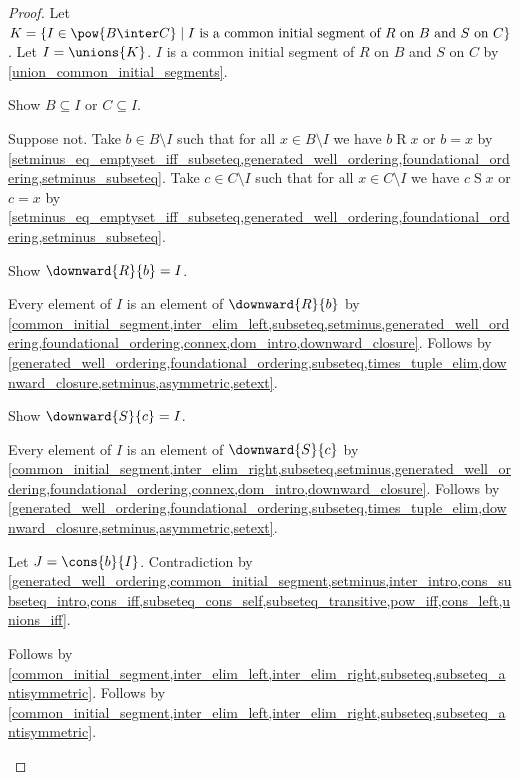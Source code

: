 \begin{proof}
    Let $K = \{I\in\pow{B\inter C}\mid \text{$I$ is a common initial segment of $R$ on $B$ and $S$ on $C$}\}$.
    Let $I = \unions{K}$.
    $I$ is a common initial segment of $R$ on $B$ and $S$ on $C$
        by \cref{union_common_initial_segments}.

    Show $B\subseteq I$ or $C\subseteq I$.
    \begin{subproof}
        Suppose not.
        Take $b\in B\setminus I$ such that for all $x\in B\setminus I$
            we have $b\mathrel{R}x$ or $b=x$ by \cref{setminus_eq_emptyset_iff_subseteq,generated_well_ordering,foundational_ordering,setminus_subseteq}.
        Take $c\in C\setminus I$ such that for all $x\in C\setminus I$
            we have $c\mathrel{S}x$ or $c=x$ by \cref{setminus_eq_emptyset_iff_subseteq,generated_well_ordering,foundational_ordering,setminus_subseteq}.

        Show $\downward{R}{b}=I$.
        \begin{subproof}
            Every element of $I$ is an element of $\downward{R}{b}$
                by \cref{common_initial_segment,inter_elim_left,subseteq,setminus,generated_well_ordering,foundational_ordering,connex,dom_intro,downward_closure}.
            Follows by \cref{generated_well_ordering,foundational_ordering,subseteq,times_tuple_elim,downward_closure,setminus,asymmetric,setext}.
        \end{subproof}

        Show $\downward{S}{c}=I$.
        \begin{subproof}
            Every element of $I$ is an element of $\downward{S}{c}$
                by \cref{common_initial_segment,inter_elim_right,subseteq,setminus,generated_well_ordering,foundational_ordering,connex,dom_intro,downward_closure}.
            Follows by \cref{generated_well_ordering,foundational_ordering,subseteq,times_tuple_elim,downward_closure,setminus,asymmetric,setext}.
        \end{subproof}

        Let $J=\cons{b}{I}$.
        Contradiction by \cref{generated_well_ordering,common_initial_segment,setminus,inter_intro,cons_subseteq_intro,cons_iff,subseteq_cons_self,subseteq_transitive,pow_iff,cons_left,unions_iff}.
    \end{subproof}

    \begin{byCase}
        Follows by \cref{common_initial_segment,inter_elim_left,inter_elim_right,subseteq,subseteq_antisymmetric}.
        Follows by \cref{common_initial_segment,inter_elim_left,inter_elim_right,subseteq,subseteq_antisymmetric}.
    \end{byCase}
\end{proof}

